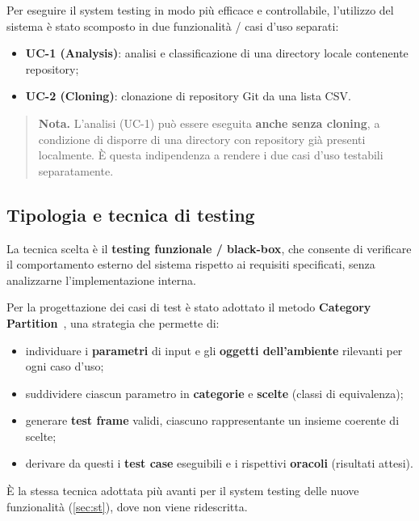 \documentclass[11pt,a4paper]{article}
\newenvironment{keypoints}
  {\begin{quote}\small}
  {\end{quote}}
\begin{document}
Per eseguire il system testing in modo pi\`u efficace e controllabile,
l'utilizzo del sistema \`e stato scomposto in due funzionalit\`a / casi d'uso
separati:

\begin{itemize}[nosep]
  \item \textbf{UC-1 (Analysis)}: analisi e classificazione di una directory
    locale contenente repository;
  \item \textbf{UC-2 (Cloning)}: clonazione di repository Git da una lista CSV.
\end{itemize}

\begin{keypoints}
\textbf{Nota.} L'analisi (UC-1) pu\`o essere eseguita \textbf{anche senza
cloning}, a condizione di disporre di una directory con repository gi\`a
presenti localmente. \`E questa indipendenza a rendere i due casi d'uso
testabili separatamente.
\end{keypoints}

\subsection{Tipologia e tecnica di testing}
\label{sec:catpart}

La tecnica scelta \`e il \textbf{testing funzionale / black-box}, che consente
di verificare il comportamento esterno del sistema rispetto ai requisiti
specificati, senza analizzarne l'implementazione interna.

Per la progettazione dei casi di test \`e stato adottato il metodo
\textbf{Category Partition}~\cite{ostrandbalcer}, una strategia che permette di:

\begin{itemize}[nosep]
  \item individuare i \textbf{parametri} di input e gli \textbf{oggetti
    dell'ambiente} rilevanti per ogni caso d'uso;
  \item suddividere ciascun parametro in \textbf{categorie} e \textbf{scelte}
    (classi di equivalenza);
  \item generare \textbf{test frame} validi, ciascuno rappresentante un insieme
    coerente di scelte;
  \item derivare da questi i \textbf{test case} eseguibili e i rispettivi
    \textbf{oracoli} (risultati attesi).
\end{itemize}

\`E la stessa tecnica adottata pi\`u avanti per il system testing delle nuove
funzionalit\`a (\cref{sec:st}), dove non viene ridescritta.
\end{document}
